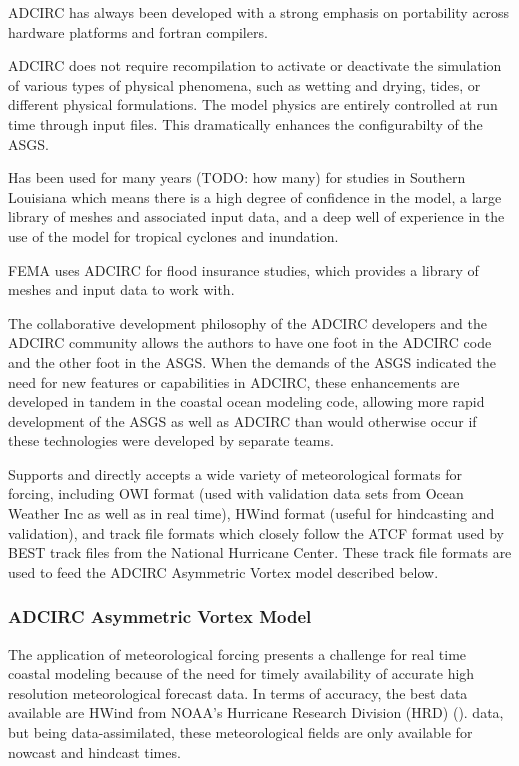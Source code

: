 \documentclass[12pt]{article}
\begin{document}
ADCIRC has always been developed with a strong emphasis on 
portability across hardware platforms and fortran compilers.

ADCIRC does not require recompilation to activate or deactivate the 
simulation of various types of physical phenomena, such as wetting 
and drying, tides, or different physical formulations. The model 
physics are entirely controlled at run time through input files. 
This dramatically enhances the configurabilty of the ASGS. 

Has been used for many years (TODO: how many) for studies in 
Southern Louisiana which means there is a high degree of confidence 
in the model, a large library of meshes and associated input data, 
and a deep well of experience in the use of the model for tropical 
cyclones and inundation. 

FEMA uses ADCIRC for flood insurance studies, which provides a library
of meshes and input data to work with.

The collaborative development philosophy of the ADCIRC developers
and the ADCIRC community allows the authors to have one foot in the
ADCIRC code and the other foot in the ASGS. When the demands of the
ASGS indicated the need for new features or capabilities in ADCIRC, 
these enhancements are developed in tandem in the coastal ocean modeling
code, allowing more rapid development of the ASGS as well as ADCIRC
than would otherwise occur if these technologies were developed by
separate teams. 

Supports and directly accepts a wide variety of meteorological 
formats for forcing, including OWI format (used with validation data 
sets from Ocean Weather Inc as well as in real time), HWind format 
(useful for hindcasting and validation), and track file formats which
closely follow the ATCF format used by BEST track files from the 
National Hurricane Center. These track file formats are used to feed
the ADCIRC Asymmetric Vortex model described below. 

\subsubsection{ADCIRC Asymmetric Vortex Model}

The application of meteorological forcing presents a challenge for 
real time coastal modeling because of the need for timely 
availability of accurate high resolution meteorological forecast 
data. In terms of accuracy, the best data available are HWind from 
NOAA's Hurricane Research Division (HRD) (\cite{PowellMD1998}). 
data, but being data-assimilated, these meteorological fields are 
only available for nowcast and hindcast times.
\end{document}
